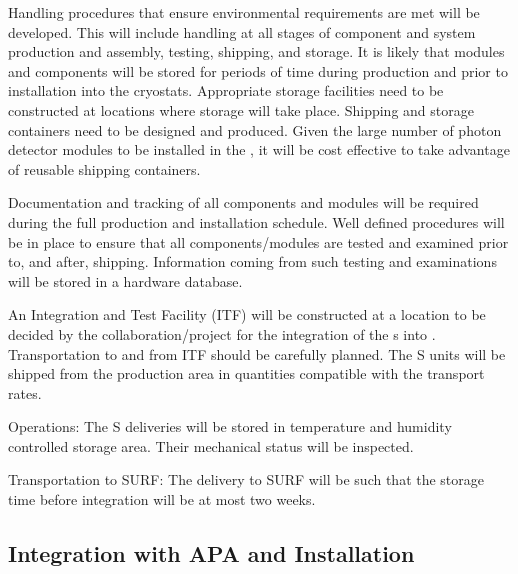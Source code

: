 Handling procedures that ensure environmental requirements are met will be developed. This will include handling at all stages of component and system production and assembly, testing, shipping, and storage. It is likely that  modules and components will be stored for periods of time during production and prior to installation into the  cryostats. Appropriate storage facilities need to be constructed at locations where storage will take place. Shipping and storage containers need to be designed and produced. Given the large number of photon detector modules to be installed in the , it will be cost effective to take advantage of reusable shipping containers.

Documentation and tracking of all components and  modules will be required during the full production and installation schedule. Well defined procedures will be in place to ensure that all components/modules are tested and examined prior to, and after, shipping. Information coming from such testing and examinations will be stored in a hardware database.

An Integration and Test Facility (ITF) will be constructed at a location to be decided by the collaboration/project for the integration of the s into . Transportation to and from ITF should be carefully planned. The S units will be shipped from the production area in quantities compatible with the  transport rates.
    
Operations: The S deliveries will be stored in temperature and humidity controlled storage area. Their mechanical status will be inspected.

Transportation to SURF: The delivery to SURF will be such that the storage time before integration will be at most two weeks.


\subsection{Integration with APA and Installation}
\label{sec:fdsp-pd-install-pd-apa}




